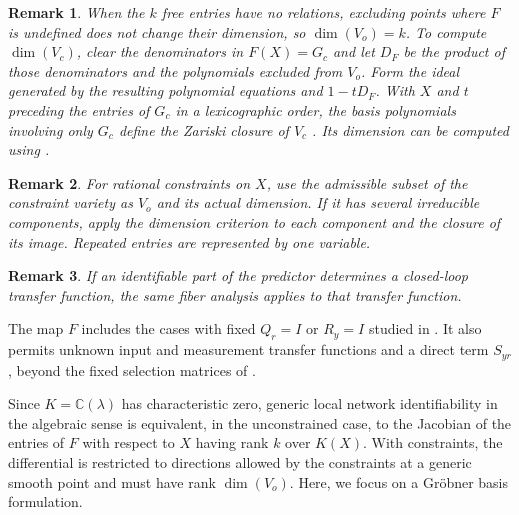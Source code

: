\documentclass[journal,twoside,web]{ieeecolor}
\newtheorem{remark}{Remark}
\begin{document}
%
\begin{remark}
%
When the $k$ free entries have no relations, excluding points where $F$
is undefined does not change their dimension, so $\dim(V_o)=k$.
To compute $\dim(V_c)$, clear the denominators in
$F(X)=G_c$ and let $D_F$ be the product of those denominators and the
polynomials excluded from $V_o$. Form the ideal generated by the resulting
polynomial equations and $1-tD_F$. With $X$ and $t$ preceding the entries
of $G_c$ in a lexicographic order, the basis polynomials involving only
$G_c$ define the Zariski closure of $V_c$ \cite[Ch.~3.3]{cox+lit+she92}.
Its dimension can be computed using \cite{udd13}.
%
\end{remark}
%
\begin{remark}
%
For rational constraints on $X$, use the admissible subset of the constraint
variety as $V_o$ and its actual dimension. If it has several irreducible
components, apply the dimension criterion to each component and the closure
of its image. Repeated entries are represented by one variable.
%
\end{remark}
%
\begin{remark}
%
If an identifiable part of the predictor determines a closed-loop transfer
function, the same fiber analysis applies to that transfer function.
%
\end{remark}
%
The map $F$ includes the cases with fixed $Q_r=I$ or $R_y=I$ studied in
\cite{hen+gev+baz19,SHI2022110093}. It also permits unknown input and
measurement transfer functions and a direct term $S_{yr}$, beyond the fixed selection
matrices of \cite{leg25}.

Since $K=\mathbb C(\lambda)$ has characteristic zero, generic local network
identifiability in the algebraic sense is equivalent, in the unconstrained
case, to the Jacobian of the entries of $F$ with respect to $X$ having rank
$k$ over $K(X)$. With constraints, the differential is restricted to
directions allowed by the constraints at a generic smooth point and must have rank
$\dim(V_o)$. Here, we focus on a Gröbner basis formulation.
%
\end{document}
